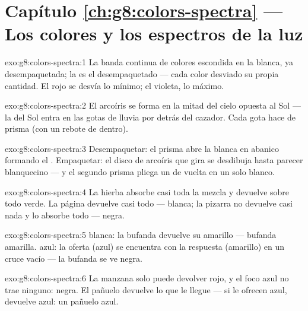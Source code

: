 \section*{Capítulo \ref{ch:g8:colors-spectra} --- Los colores y los espectros de la luz}

\begin{solution}{exo:g8:colors-spectra:1}
La banda continua de colores escondida en la  blanca, ya
desempaquetada; la  es el desempaquetado --- cada color
desviado su propia cantidad. El rojo se desvía lo mínimo; el violeta,
lo máximo.
\end{solution}

\begin{solution}{exo:g8:colors-spectra:2}
El arcoíris se forma en la mitad del cielo opuesta al Sol --- la 
del Sol entra en las gotas de lluvia por detrás del cazador. Cada gota
hace de prisma (con un rebote de  dentro).
\end{solution}

\begin{solution}{exo:g8:colors-spectra:3}
Desempaquetar: el prisma abre la  blanca en abanico formando el
. Empaquetar: el disco de arcoíris que gira se
desdibuja hasta parecer blanquecino --- y el segundo prisma pliega un
 de vuelta en un solo  blanco.
\end{solution}

\begin{solution}{exo:g8:colors-spectra:4}
La hierba absorbe casi toda la mezcla y devuelve sobre todo verde. La
página devuelve casi todo --- blanca; la pizarra no devuelve casi nada
y lo absorbe todo --- negra.
\end{solution}

\begin{solution}{exo:g8:colors-spectra:5}
 blanca: la bufanda devuelve su amarillo --- bufanda amarilla.
 azul: la oferta (azul) se encuentra con la respuesta
(amarillo) en un cruce vacío --- la bufanda se ve negra.
\end{solution}

\begin{solution}{exo:g8:colors-spectra:6}
La manzana solo puede devolver rojo, y el foco azul no trae ninguno:
negra. El pañuelo devuelve lo que le llegue --- si le ofrecen azul,
devuelve azul: un pañuelo azul.
\end{solution}

